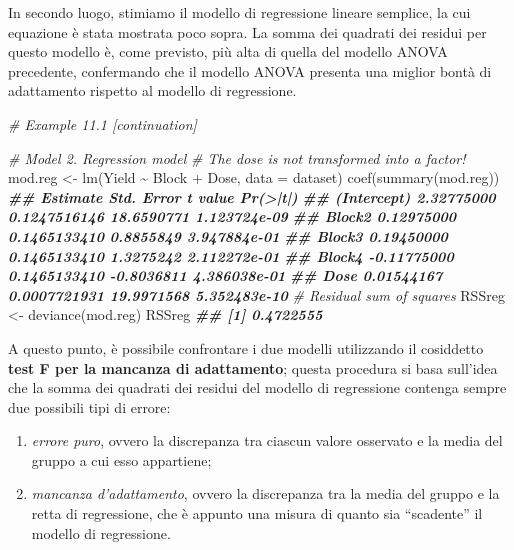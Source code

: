 \documentclass[
  12pt,
]{book}
\newenvironment{Shaded}{\begin{snugshade}}{\end{snugshade}}
\newcommand{\AttributeTok}[1]{\textcolor[rgb]{0.77,0.63,0.00}{#1}}
\newcommand{\CommentTok}[1]{\textcolor[rgb]{0.56,0.35,0.01}{\textit{#1}}}
\newcommand{\DocumentationTok}[1]{\textcolor[rgb]{0.56,0.35,0.01}{\textbf{\textit{#1}}}}
\newcommand{\FunctionTok}[1]{\textcolor[rgb]{0.00,0.00,0.00}{#1}}
\newcommand{\NormalTok}[1]{#1}
\newcommand{\OtherTok}[1]{\textcolor[rgb]{0.56,0.35,0.01}{#1}}
\newcommand{\SpecialCharTok}[1]{\textcolor[rgb]{0.00,0.00,0.00}{#1}}
\providecommand{\tightlist}{%
  \setlength{\itemsep}{0pt}\setlength{\parskip}{0pt}}
\begin{document}
In secondo luogo, stimiamo il modello di regressione lineare semplice, la cui equazione è stata mostrata poco sopra. La somma dei quadrati dei residui per questo modello è, come previsto, più alta di quella del modello ANOVA precedente, confermando che il modello ANOVA presenta una miglior bontà di adattamento rispetto al modello di regressione.

\begin{Shaded}
\begin{Highlighting}[]
\CommentTok{\# Example 11.1 [continuation]}

\CommentTok{\# Model 2. Regression model}
\CommentTok{\# The dose is not transformed into a factor! }
\NormalTok{mod.reg }\OtherTok{\textless{}{-}} \FunctionTok{lm}\NormalTok{(Yield }\SpecialCharTok{\textasciitilde{}}\NormalTok{ Block }\SpecialCharTok{+}\NormalTok{ Dose, }\AttributeTok{data =}\NormalTok{ dataset) }
\FunctionTok{coef}\NormalTok{(}\FunctionTok{summary}\NormalTok{(mod.reg))}
\DocumentationTok{\#\#                Estimate   Std. Error    t value     Pr(\textgreater{}|t|)}
\DocumentationTok{\#\# (Intercept)  2.32775000 0.1247516146 18.6590771 1.123724e{-}09}
\DocumentationTok{\#\# Block2       0.12975000 0.1465133410  0.8855849 3.947884e{-}01}
\DocumentationTok{\#\# Block3       0.19450000 0.1465133410  1.3275242 2.112272e{-}01}
\DocumentationTok{\#\# Block4      {-}0.11775000 0.1465133410 {-}0.8036811 4.386038e{-}01}
\DocumentationTok{\#\# Dose         0.01544167 0.0007721931 19.9971568 5.352483e{-}10}
\CommentTok{\# Residual sum of squares}
\NormalTok{RSSreg }\OtherTok{\textless{}{-}} \FunctionTok{deviance}\NormalTok{(mod.reg)}
\NormalTok{RSSreg}
\DocumentationTok{\#\# [1] 0.4722555}
\end{Highlighting}
\end{Shaded}

A questo punto, è possibile confrontare i due modelli utilizzando il cosiddetto \textbf{test F per la mancanza di adattamento}; questa procedura si basa sull'idea che la somma dei quadrati dei residui del modello di regressione contenga sempre due possibili tipi di errore:

\begin{enumerate}
\def\labelenumi{\arabic{enumi}.}
\tightlist
\item
  \emph{errore puro}, ovvero la discrepanza tra ciascun valore osservato e la media del gruppo a cui esso appartiene;
\item
  \emph{mancanza d'adattamento}, ovvero la discrepanza tra la media del gruppo e la retta di regressione, che è appunto una misura di quanto sia ``scadente'' il modello di regressione.
\end{enumerate}
\end{document}
